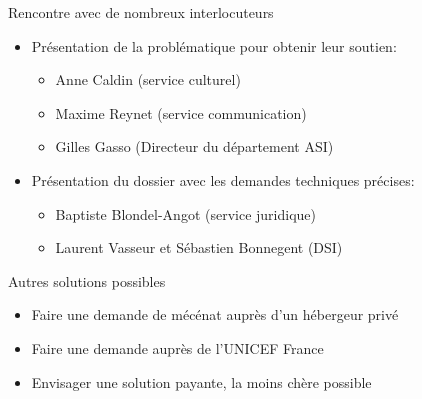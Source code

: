 \begin{frame}
	\begin{block}{Rencontre avec de nombreux interlocuteurs}
	\begin{itemize}
    	\item Présentation de la problématique pour obtenir leur soutien:
		\begin{itemize}
			\item Anne Caldin (service culturel)
			\item Maxime Reynet (service communication)
			\item Gilles Gasso (Directeur du département ASI)
		\end{itemize}
		\item Présentation du dossier avec les demandes techniques précises:
		\begin{itemize}
			\item Baptiste Blondel-Angot (service juridique)
			\item Laurent Vasseur et Sébastien Bonnegent (DSI)
		\end{itemize}    
	\end{itemize}
	\end{block}
\end{frame}

\begin{frame}
	\begin{block}{Autres solutions possibles}
      \begin{itemize}
        \item Faire une demande de mécénat auprès d'un hébergeur privé
        \item Faire une demande auprès de l'UNICEF France
        \item Envisager une solution payante, la moins chère possible
      \end{itemize}
    \end{block}
\end{frame}

